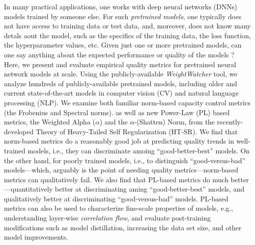 
In many practical applications, one works with deep neural networks (DNNs) models trained by someone else.
For such \emph{pretrained models}, one typically does not have access to training data or test data, 
and, moreover,  does not know many detals aout the  model, such as
the specifics of the training data, the loss function, the hyperparameter values, etc.
Given just one or more pretrained models, can one say anything about the expected performance or quality of the models ?
Here, we present and evaluate empirical quality metrics for pretrained neural network models at scale.
%
Using the publicly-available \emph{WeightWatcher} tool, we analyze hundreds of publicly-available pretrained models, including older and current state-of-the-art models in computer vision (CV) and natural language processing (NLP).
We examine both familiar norm-based capacity control metrics (the Frobenius and  Spectral norms). as well as
new Power-Law (PL) based metrics,  the Weighted Alpha ($\alpha$) and the $\alpha$-(Shatten) Norm,
from the recently-developed Theory of Heavy-Tailed Self Regularization (HT-SR).
We find that norm-based metrics do a reasonably good job at predicting quality trends in well-trained models, i.e., they can discriminate amoing ``good-better-best''  models.
On the other hand, for poorly trained models, i.e., to distinguish ``good-versus-bad'' models---which, arguably is the point of needing quality metrics---norm-based metrics can qualitatively fail.  
We also find that PL-based metrics do much better---quantitatively better at discriminating aming ``good-better-best'' models, and qualitatively better at discriminating ``good-versus-bad'' models.
PL-based metrics can also be used to characterize fine-scale properties of models, e.g., understanding layer-wise \emph{correlation flow}, and evaluate post-training modifications such as model distillation, increasing the data set size, and other model improvements.

